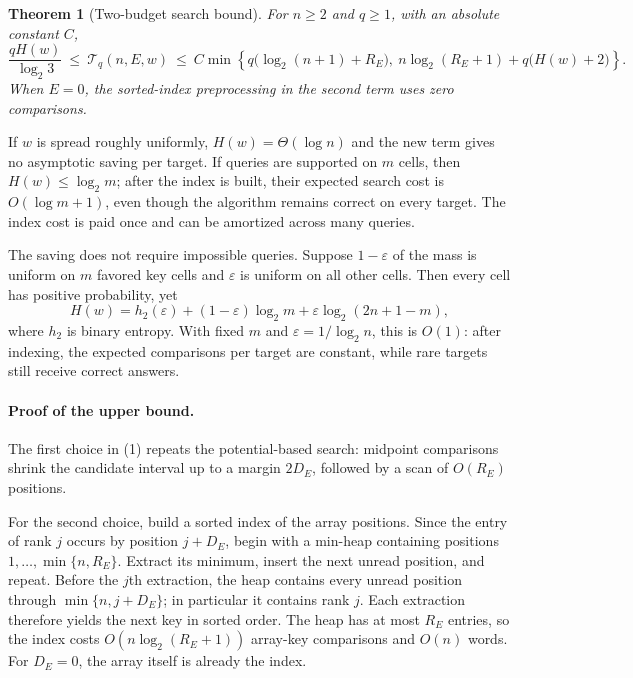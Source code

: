 \documentclass[11pt,letterpaper]{article}
\newtheorem{theorem}{Theorem}
\begin{document}
\begin{theorem}[Two-budget search bound]
For $n\ge2$ and $q\ge1$, with an absolute constant $C$,
\[
 \boxed{\displaystyle
 \frac{qH(w)}{\log_2 3}
 \ \le\ \mathcal T_q(n,E,w)\
 \le\ C\min\left\{
 q\bigl(\log_2(n+1)+R_E\bigr),\
 n\log_2(R_E+1)+q\bigl(H(w)+2\bigr)
 \right\}.}
 \tag{1}
\]
When $E=0$, the sorted-index preprocessing in the second term uses
zero comparisons.
\end{theorem}

If $w$ is spread roughly uniformly, $H(w)=\Theta(\log n)$ and the
new term gives no asymptotic saving per target. If queries are
supported on $m$ cells, then $H(w)\le\log_2 m$; after the index is
built, their expected search cost is $O(\log m+1)$, even though the
algorithm remains correct on every target. The index cost is paid once
and can be amortized across many queries.

The saving does not require impossible queries. Suppose $1-\varepsilon$
of the mass is uniform on $m$ favored key cells and $\varepsilon$ is
uniform on all other cells. Then every cell has positive probability,
yet
\[
 H(w)=h_2(\varepsilon)+(1-\varepsilon)\log_2 m
       +\varepsilon\log_2(2n+1-m),
\]
where $h_2$ is binary entropy. With fixed $m$ and
$\varepsilon=1/\log_2 n$, this is $O(1)$: after indexing,
the expected comparisons per target are constant, while rare targets
still receive correct answers.

\newpage
\paragraph{Proof of the upper bound.}
The first choice in (1) repeats the potential-based search: midpoint
comparisons shrink the candidate interval up to a margin $2D_E$,
followed by a scan of $O(R_E)$ positions.

For the second choice, build a sorted index of the array positions.
Since the entry of rank $j$ occurs by position $j+D_E$, begin with a
min-heap containing positions $1,\ldots,\min\{n,R_E\}$. Extract its
minimum, insert the next unread position, and repeat. Before the $j$th
extraction, the heap contains every unread position through
$\min\{n,j+D_E\}$; in particular it contains rank $j$.
Each extraction therefore yields the next key in sorted order.
The heap has at most $R_E$ entries, so the index costs
$O(n\log_2(R_E+1))$ array-key comparisons and $O(n)$ words.
For $D_E=0$, the array itself is already the index.
\end{document}
